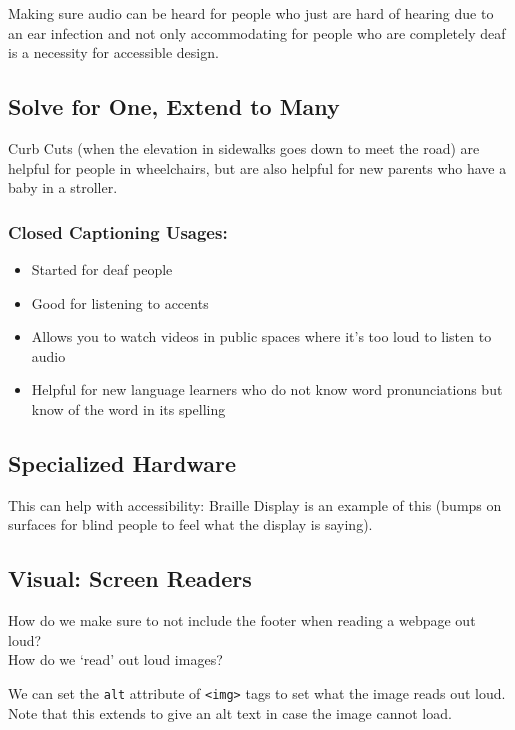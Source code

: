 \begin{shaded}
Making sure audio can be heard for people who just are hard of hearing due to an ear infection and not only accommodating for people who are completely deaf is a necessity for accessible design.
\end{shaded}

\subsection{Solve for One, Extend to Many}
Curb Cuts (when the elevation in sidewalks goes down to meet the road) are helpful for people in wheelchairs, but are also helpful for new parents who have a baby in a stroller.

\subsubsection{Closed Captioning Usages:}
\begin{itemize}
    \item Started for deaf people
    \item Good for listening to accents
    \item Allows you to watch videos in public spaces where it's too loud to listen to audio
    \item Helpful for new language learners who do not know word pronunciations but know of the word in its spelling
\end{itemize}

\subsection{Specialized Hardware}
This can help with accessibility: Braille Display is an example of this (bumps on surfaces for blind people to feel what the display is saying).

\subsection{Visual: Screen Readers}
How do we make sure to not include the footer when reading a webpage out loud?\\
How do we `read' out loud images?
\begin{shaded}
    We can set the \texttt{alt} attribute of \texttt{<img>} tags to set what the image reads out loud. Note that this extends to give an alt text in case the image cannot load.
\end{shaded}

